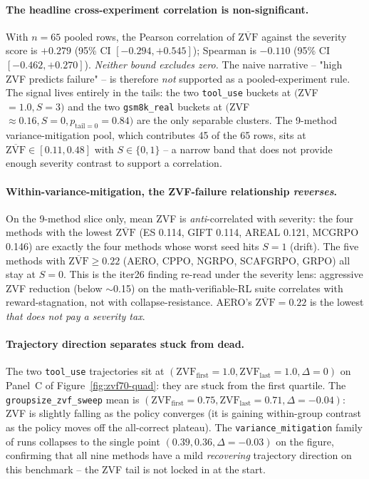 \paragraph{The headline cross-experiment correlation is non-significant.}
With $n=65$ pooled rows, the Pearson correlation of
$\overline{\mathrm{ZVF}}$ against the severity score is
$+0.279$ (95\% CI $[-0.294, +0.545]$); Spearman is $-0.110$ (95\%
CI $[-0.462, +0.270]$). \emph{Neither bound excludes zero.} The
naive narrative -- "high ZVF predicts failure" -- is therefore
\emph{not} supported as a pooled-experiment rule. The signal
lives entirely in the tails: the two \texttt{tool\_use} buckets at
$($ZVF$=1.0, S=3)$ and the two \texttt{gsm8k\_real} buckets at
$($ZVF$\approx 0.16, S=0, p_{\mathrm{tail}=0}=0.84)$ are the only
separable clusters. The 9-method variance-mitigation pool, which
contributes 45 of the 65 rows, sits at
$\overline{\mathrm{ZVF}}\in[0.11, 0.48]$ with $S\in\{0, 1\}$ -- a
narrow band that does not provide enough severity contrast to
support a correlation.

\paragraph{Within-variance-mitigation, the ZVF-failure relationship
\emph{reverses}.}
On the 9-method slice only, mean ZVF is \emph{anti}-correlated
with severity: the four methods with the lowest
$\overline{\mathrm{ZVF}}$ (ES 0.114, GIFT 0.114, AREAL 0.121,
MCGRPO 0.146) are exactly the four methods whose worst seed hits
$S=1$ (drift). The five methods with
$\overline{\mathrm{ZVF}}\ge 0.22$ (AERO, CPPO, NGRPO, SCAFGRPO, GRPO)
all stay at $S=0$. This is the iter26 finding re-read under the
severity lens: aggressive ZVF reduction (below $\sim$0.15) on the
math-verifiable-RL suite correlates with reward-stagnation, not
with collapse-resistance. AERO's $\overline{\mathrm{ZVF}}=0.22$ is
the lowest \emph{that does not pay a severity tax}.

\paragraph{Trajectory direction separates stuck from dead.}
The two \texttt{tool\_use} trajectories sit at $(\mathrm{ZVF}_{\mathrm{first}}=1.0, \mathrm{ZVF}_{\mathrm{last}}=1.0, \Delta = 0)$
on Panel~C of Figure~\ref{fig:zvf70-quad}: they are stuck from
the first quartile. The \texttt{groupsize\_zvf\_sweep} mean is
$(\mathrm{ZVF}_{\mathrm{first}}=0.75, \mathrm{ZVF}_{\mathrm{last}}=0.71, \Delta = -0.04)$:
ZVF is slightly falling as the policy converges (it is gaining
within-group contrast as the policy moves off the all-correct
plateau). The \texttt{variance\_mitigation} family of runs
collapses to the single point $(0.39, 0.36, \Delta = -0.03)$ on
the figure, confirming that all nine methods have a mild
\emph{recovering} trajectory direction on this benchmark -- the
ZVF tail is not locked in at the start.

